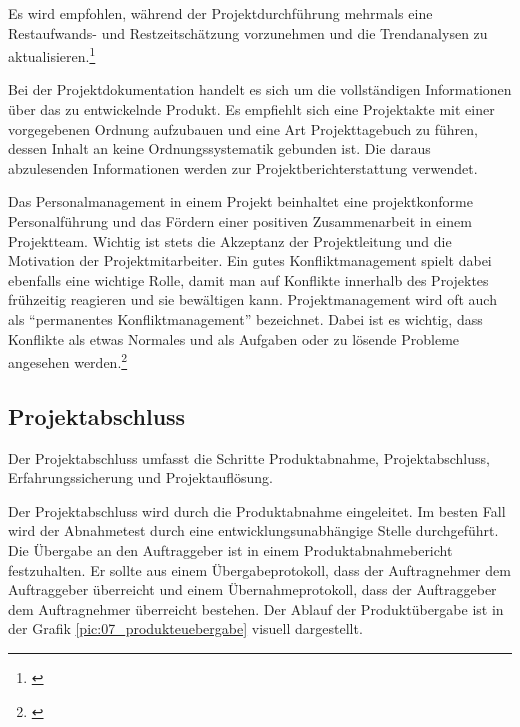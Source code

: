 Es wird empfohlen, während der Projektdurchführung mehrmals eine Restaufwands-
und Restzeitschätzung vorzunehmen und die Trendanalysen zu aktualisieren.\footnote{\citealp*[Vgl.][S. 16]{burghardt2007einfuehrung}}

Bei der Projektdokumentation handelt es sich um die vollständigen Informationen
über das zu entwickelnde Produkt. Es empfiehlt sich eine Projektakte mit einer
vorgegebenen Ordnung aufzubauen und eine Art Projekttagebuch zu führen, dessen
Inhalt an keine Ordnungssystematik gebunden ist. Die daraus abzulesenden
Informationen werden zur Projektberichterstattung verwendet.

Das Personalmanagement in einem Projekt beinhaltet eine projektkonforme
Personalführung und das Fördern einer positiven Zusammenarbeit in einem
Projektteam. Wichtig ist stets die Akzeptanz der Projektleitung und die 
Motivation der Projektmitarbeiter. Ein gutes Konfliktmanagement spielt
dabei ebenfalls eine wichtige Rolle, damit man auf Konflikte innerhalb des
Projektes frühzeitig reagieren und sie bewältigen kann. Projektmanagement
wird oft auch als ``permanentes Konfliktmanagement'' bezeichnet. Dabei ist es
wichtig, dass Konflikte als etwas Normales und als Aufgaben oder zu lösende 
Probleme angesehen werden.\footnote{\citealp*[S. 119]{kessler2004projektmanagement}}

\subsection{Projektabschluss}
Der Projektabschluss umfasst die Schritte Produktabnahme, Projektabschluss,
Erfahrungssicherung und Projektauflösung.

Der Projektabschluss wird durch die Produktabnahme eingeleitet. Im besten Fall
wird der Abnahmetest durch eine entwicklungsunabhängige Stelle durchgeführt.
Die Übergabe an den Auftraggeber ist in einem Produktabnahmebericht festzuhalten.
Er sollte aus einem Übergabeprotokoll, dass der Auftragnehmer dem Auftraggeber
überreicht und einem Übernahmeprotokoll, dass der Auftraggeber dem Auftragnehmer
überreicht bestehen. Der Ablauf der Produktübergabe ist in der Grafik
\ref{pic:07_produkteuebergabe} visuell dargestellt.

